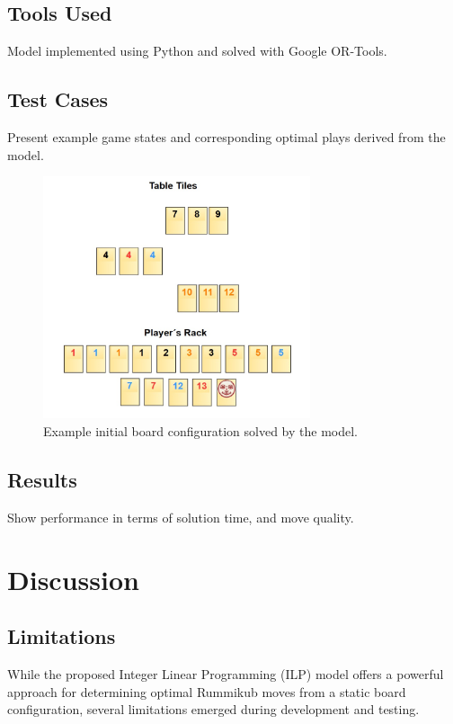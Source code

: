 \documentclass[11pt,letterpaper]{article}
\begin{document}
\subsection*{Tools Used}
Model implemented using Python and solved with Google OR-Tools\cite{or_tools}.

\subsection*{Test Cases}
Present example game states and corresponding optimal plays derived from the model.


\begin{figure}[h]
    \centering
    \includegraphics[width=0.7\textwidth]{Figures/Initial_Board.png}
    \caption{Example initial board configuration solved by the model.}
\end{figure}

\subsection*{Results}
Show performance in terms of solution time, and move quality.

\section*{Discussion}

\subsection*{Limitations}

While the proposed Integer Linear Programming (ILP) model offers a powerful approach for determining optimal Rummikub moves from a static board configuration, several limitations emerged during development and testing.
\end{document}
